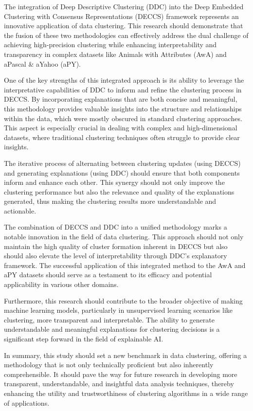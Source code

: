 The integration of Deep Descriptive Clustering (DDC) into the Deep Embedded Clustering with Consensus Representations (DECCS) framework represents an innovative application of data clustering. This research should demonstrate that the fusion of these two methodologies can effectively address the dual challenge of achieving high-precision clustering while enhancing interpretability and transparency in complex datasets like Animals with Attributes (AwA) and aPascal \& aYahoo (aPY).

One of the key strengths of this integrated approach is its ability to leverage the interpretative capabilities of DDC to inform and refine the clustering process in DECCS. By incorporating explanations that are both concise and meaningful, this methodology provides valuable insights into the structure and relationships within the data, which were mostly obscured in standard clustering approaches. This aspect is especially crucial in dealing with complex and high-dimensional datasets, where traditional clustering techniques often struggle to provide clear insights.

The iterative process of alternating between clustering updates (using DECCS) and generating explanations (using DDC) should ensure that both components inform and enhance each other. This synergy should not only improve the clustering performance but also the relevance and quality of the explanations generated, thus making the clustering results more understandable and actionable.

The combination of DECCS and DDC into a unified methodology marks a notable innovation in the field of data clustering. This approach should not only maintain the high quality of cluster formation inherent in DECCS but also should also elevate the level of interpretability through DDC’s explanatory framework. The successful application of this integrated method to the AwA and aPY datasets should serve as a testament to its efficacy and potential applicability in various other domains.

Furthermore, this research should contribute to the broader objective of making machine learning models, particularly in unsupervised learning scenarios like clustering, more transparent and interpretable. The ability to generate understandable and meaningful explanations for clustering decisions is a significant step forward in the field of explainable AI.

In summary, this study should set a new benchmark in data clustering, offering a methodology that is not only technically proficient but also inherently comprehensible. It should pave the way for future research in developing more transparent, understandable, and insightful data analysis techniques, thereby enhancing the utility and trustworthiness of clustering algorithms in a wide range of applications.